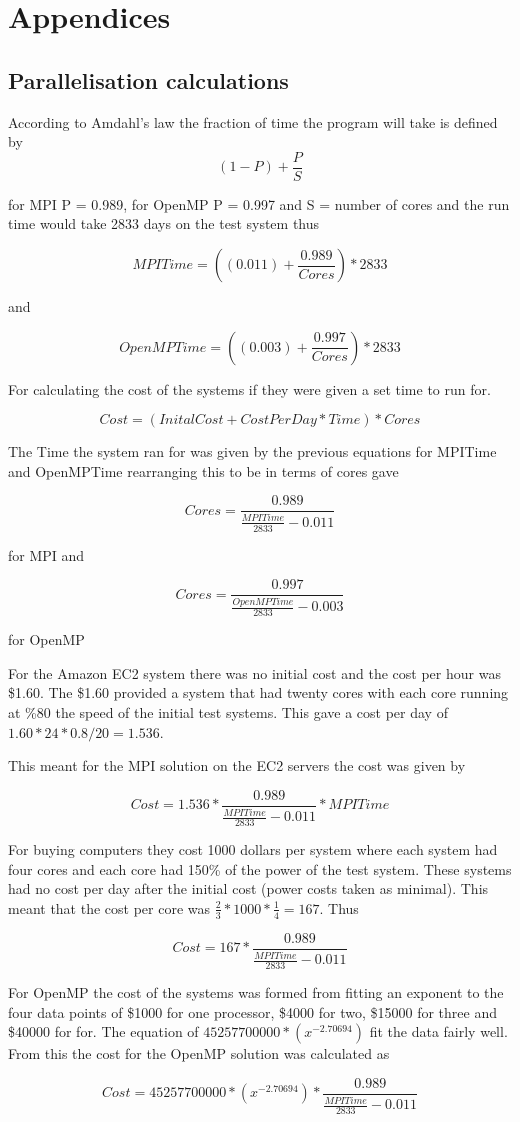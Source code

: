 \section*{Appendices}

\subsection*{Parallelisation calculations }

According to Amdahl's law the fraction of time the program will take is defined by
\[
 (1-P) + \frac{P}{S}
 \]
 
for MPI P = 0.989, for OpenMP P = 0.997 and S = number of cores and the run time would take 2833 days on the test system thus

\[
 MPITime = ((0.011) + \frac{0.989}{Cores})*2833
 \]
 
 and
 
\[
 OpenMPTime = ((0.003) + \frac{0.997}{Cores})*2833
 \]
 
 For calculating the cost of the systems if they were given a set time to run for.
 
\[
 Cost = (InitalCost + CostPerDay * Time)*Cores
 \] 
 
 The Time the system ran for was given by the previous equations for MPITime and OpenMPTime rearranging this to be in terms of cores gave
 
\[
Cores = \frac{0.989}{\frac{MPITime}{2833} - 0.011}
\]

for MPI and

\[
Cores = \frac{0.997}{\frac{OpenMPTime}{2833} - 0.003}
\]

for OpenMP 
 
 For the Amazon EC2 system there was no initial cost and the cost per hour was \$1.60. The \$1.60 provided a system that had twenty cores with each core running at \%80 the speed of the initial test systems. This gave a cost per day of \(1.60 * 24 * 0.8 / 20 = 1.536\).
 
 This meant for the MPI solution on the EC2 servers the cost was given by
 
\[
Cost = 1.536 * \frac{0.989}{\frac{MPITime}{2833} - 0.011} * MPITime
\]

For buying computers they cost 1000 dollars per system where each system had four cores and each core had 150\% of the power of the test system. These systems had no cost per day after the initial cost (power costs taken as minimal). This meant that the cost per core was \(\frac{2}{3} * 1000 * \frac{1}{4} = 167 \). Thus 

\[
Cost = 167 * \frac{0.989}{\frac{MPITime}{2833} - 0.011}
\]

For OpenMP the cost of the systems was formed from fitting an exponent to the four data points of \$1000 for one processor, \$4000 for two, \$15000 for three and \$40000 for for. The equation of \(45257700000*(x^{-2.70694})\) fit the data fairly well. From this the cost for the OpenMP solution was calculated as 

\[
Cost = 45257700000*(x^{-2.70694}) * \frac{0.989}{\frac{MPITime}{2833} - 0.011}
\]
